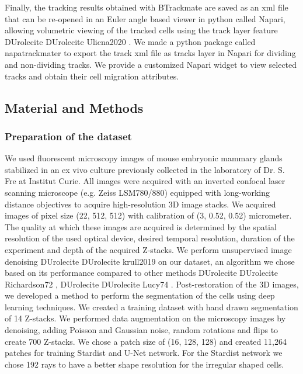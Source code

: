 \documentclass[letterpaper,compsoc,twoside]{IEEEtran}
\providecommand*{\DUrole}[2]{%
  \ifcsname DUrole#1\endcsname%
    \csname DUrole#1\endcsname{#2}%
  \else%
    #2%
  \fi%
}
\begin{document}
Finally, the tracking results obtained with BTrackmate are saved as an xml file that can be re-opened in an Euler angle based viewer in python called Napari, allowing volumetric viewing of the tracked cells using the track layer feature \DUrole{cite}{Ulicna2020}. We made a python package called napatrackmater to export the track xml file as tracks layer in Napari for dividing and non-dividing tracks. We provide a customized Napari widget to view selected tracks and obtain their cell migration attributes.

\subsection{Material and Methods%
  \label{material-and-methods}%
}


\subsubsection{Preparation of the dataset%
  \label{preparation-of-the-dataset}%
}


We used fluorescent microscopy images of mouse embryonic mammary glands stabilized in an ex vivo culture previously collected in the laboratory of Dr. S. Fre at Institut Curie. All images were acquired with an inverted confocal laser scanning microscope (e.g. Zeiss LSM780/880) equipped with long-working distance objectives to acquire high-resolution 3D image stacks. We acquired images of pixel size (22, 512, 512) with calibration of (3, 0.52, 0.52) micrometer.
The quality at which these images are acquired is determined by the spatial resolution of the used optical device, desired temporal resolution, duration of the experiment and depth of the acquired Z-stacks. We perform unsupervised image denoising \DUrole{cite}{krull2019} on our dataset, an algorithm we chose based on its performance compared to other methods \DUrole{cite}{Richardson72}, \DUrole{cite}{Lucy74}.
Post-restoration of the 3D images, we developed a method to perform the segmentation of the cells using deep learning techniques. We created a training dataset with hand drawn segmentation of 14 Z-stacks. We performed data augmentation on the microscopy images by denoising, adding Poisson and Gaussian noise, random rotations and flips to create 700 Z-stacks. We chose a patch size of (16, 128, 128) and created 11,264 patches for training Stardist and U-Net network. For the Stardist network we chose 192 rays to have a better shape resolution for the irregular shaped cells.
\end{document}
